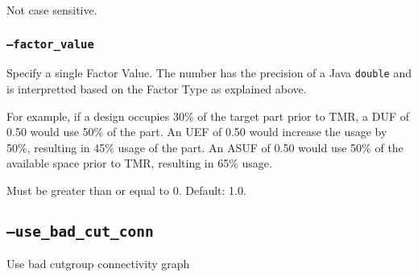 Not case sensitive.

\subsubsection{\texttt{--factor\_value}}
Specify a single Factor Value.  The number has the precision of a Java 
\texttt{double} and is interpretted based on the Factor Type as explained above.

For example, if a design occupies 30\% of the target part prior to TMR, a DUF
of 0.50 would use 50\% of the part. An UEF of 0.50 would increase the usage by
50\%, resulting in 45\% usage of the part. An ASUF of 0.50 would use 50\% of the
available space prior to TMR, resulting in 65\% usage.

Must be greater than or equal to 0. Default: 1.0.

\subsection{\texttt{--use\_bad\_cut\_conn}}
Use bad cutgroup connectivity graph





